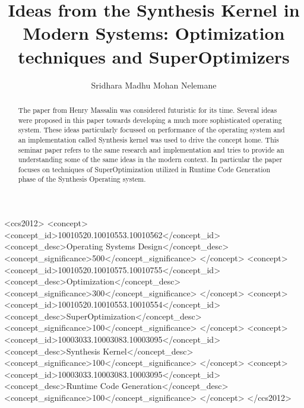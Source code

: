 \documentclass[sigconf]{acmart}
\begin{document}
\title{Ideas from the Synthesis Kernel in Modern Systems: Optimization techniques and SuperOptimizers}

\author{Sridhara Madhu Mohan Nelemane}

\renewcommand{\shortauthors}{Trovato et al.}

\begin{abstract}

    The paper from Henry Massalin \cite{synthesis92} was considered futuristic 
    for its time. Several ideas were proposed in this paper towards developing
    a much more sophisticated operating system. These ideas particularly focussed 
    on performance of the operating system and an implementation called Synthesis
    kernel was used to drive the concept home. This seminar paper refers to the 
    same research and implementation and tries to provide an understanding
    some of the same ideas in the modern context. In particular the paper focuses on
    techniques of SuperOptimization utilized in Runtime Code Generation phase
    of the Synthesis Operating system. 

\end{abstract}

\begin{CCSXML}
<ccs2012>
 <concept>
  <concept_id>10010520.10010553.10010562</concept_id>
  <concept_desc>Operating Systems Design</concept_desc>
  <concept_significance>500</concept_significance>
 </concept>
 <concept>
  <concept_id>10010520.10010575.10010755</concept_id>
  <concept_desc>Optimization</concept_desc>
  <concept_significance>300</concept_significance>
 </concept>
 <concept>
  <concept_id>10010520.10010553.10010554</concept_id>
  <concept_desc>SuperOptimization</concept_desc>
  <concept_significance>100</concept_significance>
 </concept>
 <concept>
  <concept_id>10003033.10003083.10003095</concept_id>
  <concept_desc>Synthesis Kernel</concept_desc>
  <concept_significance>100</concept_significance>
 </concept>
 <concept>
  <concept_id>10003033.10003083.10003095</concept_id>
  <concept_desc>Runtime Code Generation</concept_desc>
  <concept_significance>100</concept_significance>
 </concept>
</ccs2012>
\end{CCSXML}
\end{document}
